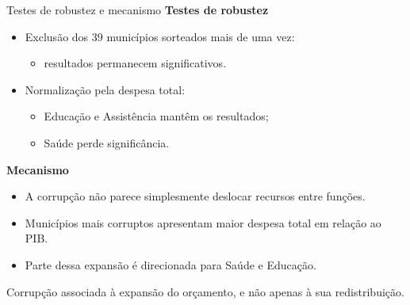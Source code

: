 \documentclass[
  10pt,
  ignorenonframetext,
  aspectratio=169,
  brazilian,
]{beamer}
\providecommand{\tightlist}{%
  \setlength{\itemsep}{0pt}\setlength{\parskip}{0pt}}
\begin{document}
\begin{frame}{Testes de robustez e mecanismo}
\protect{}\label{testes-de-robustez-e-mecanismo}
\textbf{Testes de robustez}

\begin{itemize}
\tightlist
\item
  Exclusão dos 39 municípios sorteados mais de uma vez:

  \begin{itemize}
  \tightlist
  \item
    resultados permanecem significativos.
  \end{itemize}
\item
  Normalização pela despesa total:

  \begin{itemize}
  \tightlist
  \item
    Educação e Assistência mantêm os resultados;
  \item
    Saúde perde significância.
  \end{itemize}
\end{itemize}

\textbf{Mecanismo}

\begin{itemize}
\tightlist
\item
  A corrupção não parece simplesmente deslocar recursos entre funções.
\item
  Municípios mais corruptos apresentam maior despesa total em relação ao
  PIB.
\item
  Parte dessa expansão é direcionada para Saúde e Educação.
\end{itemize}

Corrupção associada à expansão do orçamento, e não apenas à sua
redistribuição.
\end{frame}
\end{document}
